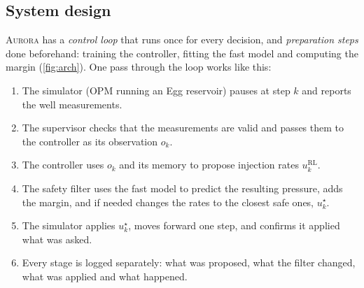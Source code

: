 \documentclass[11pt,letterpaper]{article}
\newcommand{\aur}{\textsc{Aurora}}
\begin{document}
\subsection{System design}

\aur{} has a \emph{control loop} that runs once for every decision, and \emph{preparation
steps} done beforehand: training the controller, fitting the fast model and computing the
margin (\cref{fig:arch}). One pass through the loop works like this:
\begin{enumerate}
\item The simulator (OPM running an Egg reservoir) pauses at step $k$ and reports the well measurements.
\item The supervisor checks that the measurements are valid and passes them to the controller as its observation $o_k$.
\item The controller uses $o_k$ and its memory to propose injection rates $u^{\mathrm{RL}}_k$.
\item The safety filter uses the fast model to predict the resulting pressure, adds the margin, and if needed changes the rates to the closest safe ones, $u^\star_k$.
\item The simulator applies $u^\star_k$, moves forward one step, and confirms it applied what was asked.
\item Every stage is logged separately: what was proposed, what the filter changed, what was applied and what happened.
\end{enumerate}
\end{document}
